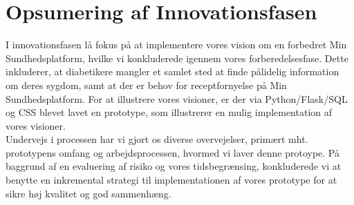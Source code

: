 \section{Opsumering af Innovationsfasen}
I innovationsfasen lå fokus på at implementere vores vision om en forbedret Min Sundhedsplatform, hvilke vi konkluderede igennem vores forberedelsesfase. Dette inkluderer, at diabetikere mangler et samlet sted at finde pålidelig information om deres sygdom, samt at der er behov for receptfornyelse på Min Sundhedsplatform. For at illustrere vores visioner, er der via Python/Flask/SQL og CSS blevet lavet en prototype, som illustrerer en mulig implementation af vores visioner.\\
Undervejs i processen har vi gjort os diverse overvejelser, primært mht. prototypens omfang og arbejdsprocessen, hvormed vi laver denne protoype. På baggrund af en evaluering af risiko og vores tidsbegrænsing, konkluderede vi at benytte en inkremental strategi til implementationen af vores prototype for at sikre høj kvalitet og god sammenhæng. 
